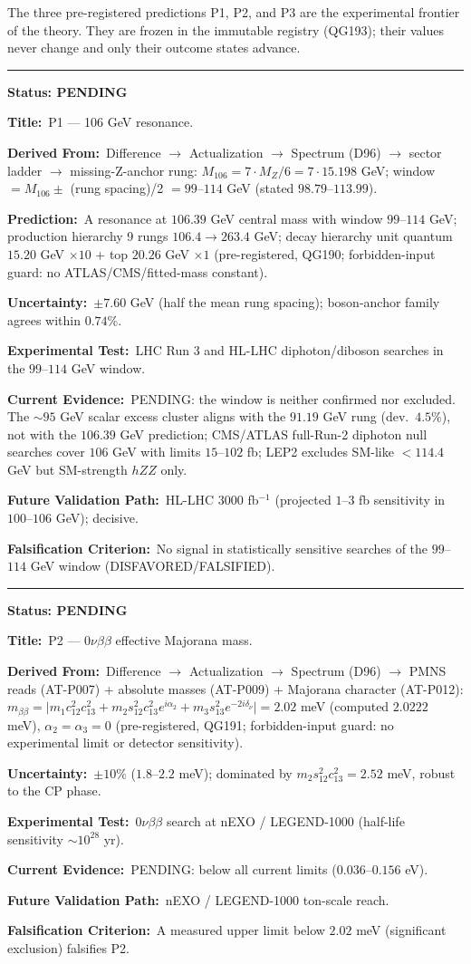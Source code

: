 \documentclass[11pt,a4paper]{article}
\newcommand{\predstart}[2]{%
  \par\medskip\noindent\hrule\par\smallskip
  \noindent{\large\bfseries #1}\hfill{\bfseries Status: #2}\par\smallskip
}
\newcommand{\pfield}[2]{%
  \noindent\textbf{#1:}~#2\par\smallskip
}
\begin{document}
The three pre-registered predictions P1, P2, and P3 are the experimental frontier of the
theory. They are frozen in the immutable registry (QG193); their values never change and
only their outcome states advance.

\predstart{AT-P039}{PENDING}
\pfield{Title}{P1 --- 106 GeV resonance.}
\pfield{Derived From}{Difference $\to$ Actualization $\to$ Spectrum (D96) $\to$ sector
ladder $\to$ missing-Z-anchor rung: $M_{106} = 7\cdot M_Z/6 = 7\cdot15.198$ GeV;
window $= M_{106} \pm$ (rung spacing)/2 $= 99$--$114$ GeV (stated
$98.79$--$113.99$).}
\pfield{Prediction}{A resonance at $106.39$ GeV central mass with window $99$--$114$ GeV;
production hierarchy 9 rungs $106.4\to263.4$ GeV; decay hierarchy unit quantum $15.20$ GeV
$\times 10$ + top $20.26$ GeV $\times 1$ (pre-registered, QG190; forbidden-input guard: no
ATLAS/CMS/fitted-mass constant).}
\pfield{Uncertainty}{$\pm7.60$ GeV (half the mean rung spacing); boson-anchor family agrees
within $0.74\%$.}
\pfield{Experimental Test}{LHC Run 3 and HL-LHC diphoton/diboson searches in the
$99$--$114$ GeV window.}
\pfield{Current Evidence}{PENDING: the window is neither confirmed nor excluded. The
$\sim95$ GeV scalar excess cluster aligns with the $91.19$ GeV rung (dev.\ $4.5\%$), not
with the $106.39$ GeV prediction; CMS/ATLAS full-Run-2 diphoton null searches cover
$106$ GeV with limits $15$--$102$ fb; LEP2 excludes SM-like $<114.4$ GeV but SM-strength
$hZZ$ only.}
\pfield{Future Validation Path}{HL-LHC $3000$ fb$^{-1}$ (projected $1$--$3$ fb sensitivity
in $100$--$106$ GeV); decisive.}
\pfield{Falsification Criterion}{No signal in statistically sensitive searches of the
$99$--$114$ GeV window (DISFAVORED/FALSIFIED).}

\predstart{AT-P040}{PENDING}
\pfield{Title}{P2 --- $0\nu\beta\beta$ effective Majorana mass.}
\pfield{Derived From}{Difference $\to$ Actualization $\to$ Spectrum (D96) $\to$ PMNS reads
(AT-P007) + absolute masses (AT-P009) + Majorana character (AT-P012):
$m_{\beta\beta} = \bigl|m_1c_{12}^2c_{13}^2 + m_2s_{12}^2c_{13}^2e^{i\alpha_2} +
m_3s_{13}^2e^{-2i\delta_\nu}\bigr| = 2.02$ meV (computed $2.0222$ meV), $\alpha_2 = \alpha_3
= 0$ (pre-registered, QG191; forbidden-input guard: no experimental limit or detector
sensitivity).}
\pfield{Uncertainty}{$\pm10\%$ ($1.8$--$2.2$ meV); dominated by $m_2 s_{12}^2 c_{13}^2 =
2.52$ meV, robust to the CP phase.}
\pfield{Experimental Test}{$0\nu\beta\beta$ search at nEXO / LEGEND-1000 (half-life
sensitivity $\sim10^{28}$ yr).}
\pfield{Current Evidence}{PENDING: below all current limits ($0.036$--$0.156$ eV).}
\pfield{Future Validation Path}{nEXO / LEGEND-1000 ton-scale reach.}
\pfield{Falsification Criterion}{A measured upper limit below $2.02$ meV (significant
exclusion) falsifies P2.}
\end{document}
